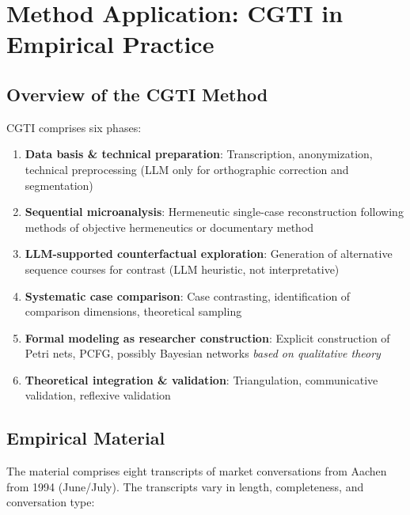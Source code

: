 \documentclass[12pt,a4paper]{article}
\begin{document}
\section{Method Application: CGTI in Empirical Practice}

\subsection{Overview of the CGTI Method}

CGTI comprises six phases:

\begin{enumerate}
    \item \textbf{Data basis \& technical preparation}: Transcription, anonymization, technical preprocessing (LLM only for orthographic correction and segmentation)
    \item \textbf{Sequential microanalysis}: Hermeneutic single-case reconstruction following methods of objective hermeneutics or documentary method
    \item \textbf{LLM-supported counterfactual exploration}: Generation of alternative sequence courses for contrast (LLM heuristic, not interpretative)
    \item \textbf{Systematic case comparison}: Case contrasting, identification of comparison dimensions, theoretical sampling
    \item \textbf{Formal modeling as researcher construction}: Explicit construction of Petri nets, PCFG, possibly Bayesian networks \textit{based on qualitative theory}
    \item \textbf{Theoretical integration \& validation}: Triangulation, communicative validation, reflexive validation
\end{enumerate}

\subsection{Empirical Material}

The material comprises eight transcripts of market conversations from Aachen from 1994 (June/July). The transcripts vary in length, completeness, and conversation type:
\end{document}
